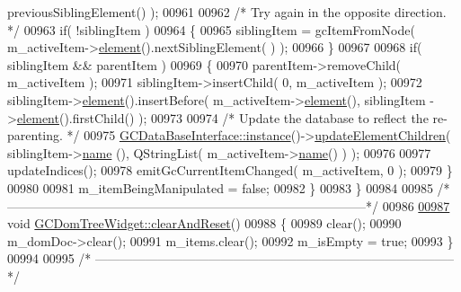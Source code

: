 \begin{DoxyCode}
      previousSiblingElement() );
00961 
00962     \textcolor{comment}{/* Try again in the opposite direction. */}
00963     \textcolor{keywordflow}{if}( !siblingItem )
00964     \{
00965       siblingItem = gcItemFromNode( m\_activeItem->\hyperlink{class_g_c_tree_widget_item_a584cad866bdbd94710d31eb77b804d84}{element}().nextSiblingElement(
       ) );
00966     \}
00967 
00968     \textcolor{keywordflow}{if}( siblingItem && parentItem )
00969     \{
00970       parentItem->removeChild( m\_activeItem );
00971       siblingItem->insertChild( 0, m\_activeItem );
00972       siblingItem->\hyperlink{class_g_c_tree_widget_item_a584cad866bdbd94710d31eb77b804d84}{element}().insertBefore( m\_activeItem->\hyperlink{class_g_c_tree_widget_item_a584cad866bdbd94710d31eb77b804d84}{element}(), siblingItem
      ->\hyperlink{class_g_c_tree_widget_item_a584cad866bdbd94710d31eb77b804d84}{element}().firstChild() );
00973 
00974       \textcolor{comment}{/* Update the database to reflect the re-parenting. */}
00975       \hyperlink{class_g_c_data_base_interface_a1baea9c0667aa8b610ec30076fcab84c}{GCDataBaseInterface::instance}()->\hyperlink{class_g_c_data_base_interface_a91a60134bfb21a3f49d826340bebb852}{updateElementChildren}( siblingItem->\hyperlink{class_g_c_tree_widget_item_a3af8c66a690cd55986a38b996a375ba4}{name}
      (), QStringList( m\_activeItem->\hyperlink{class_g_c_tree_widget_item_a3af8c66a690cd55986a38b996a375ba4}{name}() ) );
00976 
00977       updateIndices();
00978       emitGcCurrentItemChanged( m\_activeItem, 0 );
00979     \}
00980 
00981     m\_itemBeingManipulated = \textcolor{keyword}{false};
00982   \}
00983 \}
00984 
00985 \textcolor{comment}{/*
      --------------------------------------------------------------------------------------*/}
00986 
\hypertarget{gcdomtreewidget_8cpp_source_l00987}{}\hyperlink{class_g_c_dom_tree_widget_a3716c84a2a4fadc653cfac157caa215d}{00987} \textcolor{keywordtype}{void} \hyperlink{class_g_c_dom_tree_widget_a3716c84a2a4fadc653cfac157caa215d}{GCDomTreeWidget::clearAndReset}()
00988 \{
00989   clear();
00990   m\_domDoc->clear();
00991   m\_items.clear();
00992   m\_isEmpty = \textcolor{keyword}{true};
00993 \}
00994 
00995 \textcolor{comment}{/*
      --------------------------------------------------------------------------------------*/}
\end{DoxyCode}
